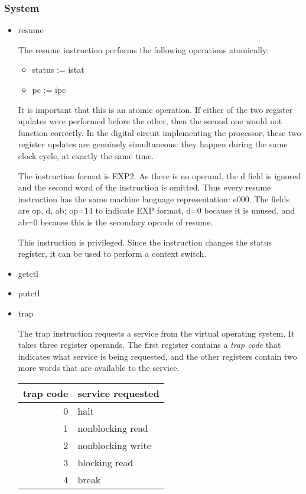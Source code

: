 \documentclass[11pt]{article}
\begin{document}
\subsubsection*{System}
\label{sec:org775e34e}
\begin{itemize}
\item resume
\label{sec:org88622f8}

The resume instruction performs the following operations atomically:

\begin{itemize}
\item status := istat
\item pc := ipc
\end{itemize}

It is important that this is an atomic operation.  If either of the
two register updates were performed before the other, then the second
one would not function correctly.  In the digital circuit implementing
the processor, these two register updates are genuinely simultaneous:
they happen during the same clock cycle, at exactly the same time.

The instruction format is EXP2.  As there is no operand, the d field
is ignored and the second word of the instruction is omitted.  Thus
every resume instruction has the same machine language representation:
e000.  The fields are op, d, ab; op=14 to indicate EXP format, d=0
because it is unused, and ab=0 because this is the secondary opcode of
resume.

This instruction is privileged.  Since the instruction changes the
status register, it can be used to perform a context switch.
\item getctl
\label{sec:org136d8f5}
\item putctl
\label{sec:org35c927c}
\item trap
\label{sec:org010062d}

The trap instruction requests a service from the virtual operating system.
It takes three register operands.  The first
register contains a \emph{trap code} that indicates what service is being
requested, and the other registers contain two more words that are
available to the service.

\begin{center}
\begin{tabular}{rl}
trap code & service requested\\
\hline
0 & halt\\
1 & nonblocking read\\
2 & nonblocking write\\
3 & blocking read\\
4 & break\\
\end{tabular}
\end{center}


\end{itemize}
\end{document}
